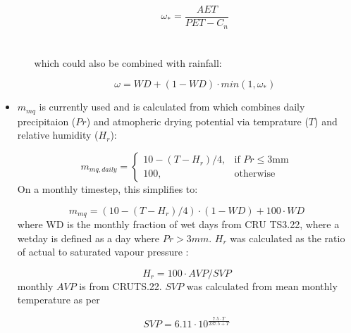 \begin{shaded}
\begin{itemize}
\begin{enumerate}
        \begin{equation}
            \omega_{*} = \frac{AET}{PET - C_n}
        \end{equation}
        \\
        \\
        which could also be combined with rainfall:

        \begin{equation}
            \omega = WD + (1 - WD) \cdot min(1, \omega_{*})
        \end{equation}

    \end{enumerate}

    \item $m_{mq}$ is currently used and is calculated from \citep{viney1991review} which combines daily precipitaion ($Pr$) and atmopheric drying potential via temprature ($T$) and relative humidity ($H_r$):

    \begin{equation}
         m_{mq, daily}=
            \begin{cases}
                10 - (T - H_r) / 4 ,& \text{if } Pr\leq 3 \text{mm}\\
                100,              & \text{otherwise}
            \end{cases}
    \end{equation}
    On a monthly timestep, this simplifies to:

    \begin{equation}
         m_{mq}=
            (10 - (T - H_r) / 4) \cdot (1 - WD)
            + 100 \cdot WD
    \end{equation}
    where WD is the monthly fraction of wet days from CRU TS3.22, where a wetday is defined as a day where $Pr > 3mm$. $H_r$ was calculated as the ratio of actual to saturated vapour pressure :

    \begin{equation}
        H_r = 100 \cdot AVP / SVP
    \end{equation}
    monthly $AVP$ is from CRUTS.22. $SVP$ was calculated from mean monthly temperature as per \citet{walter2000asce}

    \begin{equation}
        SVP = 6.11 \cdot 10^{\frac{7.5 \cdot T}{237.5 + T}}
    \end{equation}




\end{itemize}

\end{shaded}

